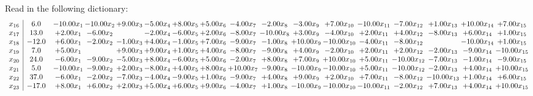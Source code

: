 \documentclass[9pt]{article}
\begin{document}
Read in the following dictionary:
\[\begin{array}{c| c c@{\hskip 2pt} c@{\hskip 2pt} c@{\hskip 2pt} c@{\hskip 2pt} c@{\hskip 2pt} c@{\hskip 2pt} c@{\hskip 2pt} c@{\hskip 2pt} c@{\hskip 2pt} c@{\hskip 2pt} c@{\hskip 2pt} c@{\hskip 2pt} c@{\hskip 2pt} c@{\hskip 2pt} c@{\hskip 2pt} }
 x_{16}   &  6.0 & -10.00 x_{1} & -10.00 x_{2} & +  9.00 x_{3} & -5.00 x_{4} & +  8.00 x_{5} & +  5.00 x_{6} & -4.00 x_{7} & -2.00 x_{8} & -3.00 x_{9} & +  7.00 x_{10} & -10.00 x_{11} & -7.00 x_{12} & +  1.00 x_{13} & + 10.00 x_{14} & +  7.00 x_{15}\\
 x_{17}   &  13.0 & +  2.00 x_{1} & -6.00 x_{2} &   & -2.00 x_{4} & -6.00 x_{5} & +  2.00 x_{6} & -8.00 x_{7} & -10.00 x_{8} & +  3.00 x_{9} & -4.00 x_{10} & +  2.00 x_{11} & +  4.00 x_{12} & -8.00 x_{13} & +  6.00 x_{14} & +  1.00 x_{15}\\
 x_{18}   &  -12.0 & +  6.00 x_{1} & -2.00 x_{2} & -1.00 x_{3} & +  4.00 x_{4} & -1.00 x_{5} & +  7.00 x_{6} & -9.00 x_{7} & -1.00 x_{8} & + 10.00 x_{9} & -10.00 x_{10} & -4.00 x_{11} & -8.00 x_{12} &   & -10.00 x_{14} & +  1.00 x_{15}\\
 x_{19}   &  7.0 & +  5.00 x_{1} &   & +  9.00 x_{3} & +  9.00 x_{4} & +  1.00 x_{5} & +  4.00 x_{6} & -8.00 x_{7} & -9.00 x_{8} & +  4.00 x_{9} & -2.00 x_{10} & +  2.00 x_{11} & +  2.00 x_{12} & -2.00 x_{13} & -9.00 x_{14} & -10.00 x_{15}\\
 x_{20}   &  24.0 & -6.00 x_{1} & -9.00 x_{2} & -5.00 x_{3} & +  8.00 x_{4} & -6.00 x_{5} & +  5.00 x_{6} & -2.00 x_{7} & +  8.00 x_{8} & +  7.00 x_{9} & + 10.00 x_{10} & +  5.00 x_{11} & -10.00 x_{12} & -7.00 x_{13} & -1.00 x_{14} & -9.00 x_{15}\\
 x_{21}   &  5.0 & -10.00 x_{1} & -9.00 x_{2} & +  2.00 x_{3} & -8.00 x_{4} & +  4.00 x_{5} & +  8.00 x_{6} & + 10.00 x_{7} & -9.00 x_{8} & -10.00 x_{9} & -10.00 x_{10} & +  5.00 x_{11} & -10.00 x_{12} & -2.00 x_{13} & +  4.00 x_{14} & + 10.00 x_{15}\\
 x_{22}   &  37.0 & -6.00 x_{1} & -2.00 x_{2} & -7.00 x_{3} & -4.00 x_{4} & -9.00 x_{5} & +  1.00 x_{6} & -9.00 x_{7} & +  4.00 x_{8} & +  9.00 x_{9} & +  2.00 x_{10} & +  7.00 x_{11} & -8.00 x_{12} & -10.00 x_{13} & +  1.00 x_{14} & +  6.00 x_{15}\\
 x_{23}   &  -17.0 & +  8.00 x_{1} & +  6.00 x_{2} & +  2.00 x_{3} & +  5.00 x_{4} & +  6.00 x_{5} & +  9.00 x_{6} & -4.00 x_{7} & +  1.00 x_{8} & -10.00 x_{9} & -10.00 x_{10} & -10.00 x_{11} & -2.00 x_{12} & +  7.00 x_{13} & +  4.00 x_{14} & + 10.00 x_{15}\\

\end{array}\]
\end{document}
